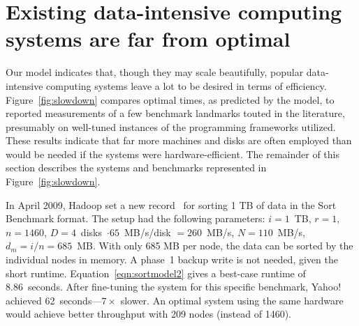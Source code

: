 \section{Existing data-intensive computing systems are far from optimal}
\label{sec:benchmarks}


%
%
%


Our model indicates that, though they may scale beautifully, popular
data-intensive computing systems leave a lot to be desired in terms of
efficiency.  Figure~\ref{fig:slowdown} compares optimal times, as
predicted by the model, to reported measurements of a few benchmark
landmarks touted in the literature, presumably on well-tuned instances
of the programming frameworks utilized. These results indicate that
far more machines and disks are often employed than would be needed
if the systems were hardware-efficient.
The remainder of this section describes the systems and benchmarks
represented in Figure~\ref{fig:slowdown}.




In April 2009,
Hadoop set a new record~\cite{hadoop2009} for sorting 1 TB of data in
the Sort Benchmark \cite{sortbenchmark} format.  The setup had the
following parameters: $i = 1$~TB, $r = 1$,
$n = 1460$, $D = 4$~disks~$\cdot 65$~MB/s/disk $= 260$~MB/s, $N = 110$~MB/s, $d_m = i/n = 685$~MB.
With only 685 MB per node, the data can be sorted by the individual nodes in
memory.
A phase~1 backup write is not needed, given the short runtime.
Equation~\ref{eqn:sortmodel2} gives a best-case runtime of 8.86~seconds.
After fine-tuning the system for this specific
benchmark, Yahoo! achieved
62~seconds---$7\times$ slower.
An optimal system using the same hardware would achieve better
throughput with 209 nodes (instead of 1460).

